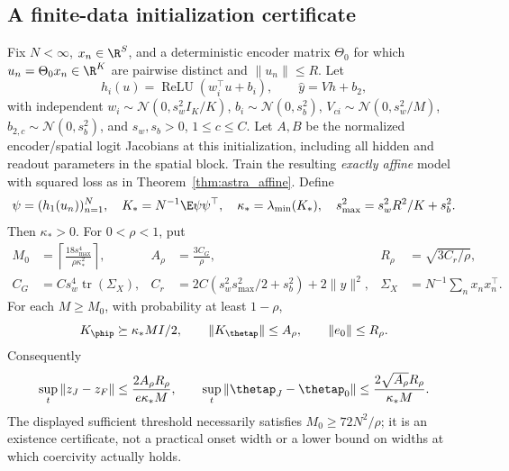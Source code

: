 \subsection{A finite-data initialization certificate}
\begin{corollary}
\label{cor:astra_init}
Fix $N<\infty$, $x_n\in\R^S$, and a deterministic encoder matrix
$\Theta_0$ for which $u_n=\Theta_0x_n\in\R^K$ are pairwise distinct
and $\|u_n\|\le R$. Let
\[
 h_i(u)=\operatorname{ReLU}(w_i^\top u+b_i),\qquad \hat y=Vh+b_2,
\]
with independent $w_i\sim\mathcal N(0,s_w^2I_K/K)$,
$b_i\sim\mathcal N(0,s_b^2)$, $V_{ci}\sim\mathcal N(0,s_w^2/M)$,
$b_{2,c}\sim\mathcal N(0,s_b^2)$, and $s_w,s_b>0$, $1\le c\le C$.
Let $A,B$ be the normalized encoder/spatial logit Jacobians at this
initialization, including all hidden and readout parameters in the
spatial block. Train the resulting \emph{exactly affine} model with
squared loss as in Theorem~\ref{thm:astra_affine}.
Define
\[
 \psi=(h_1(u_n))_{n=1}^N,\quad K_*=N^{-1}\E\psi\psi^\top,
 \quad\kappa_*=\lambda_{\min}(K_*),\quad
 s_{\max}^2=s_w^2R^2/K+s_b^2.
\]
Then $\kappa_*>0$. For $0<\rho<1$, put
\begin{align*}
 M_0&=\left\lceil\frac{18s_{\max}^4}{\rho\kappa_*^2}\right\rceil,
 & A_\rho&=\frac{3C_G}{\rho},
 & R_\rho&=\sqrt{3C_r/\rho},\\
 C_G&=Cs_w^4\operatorname{tr}(\Sigma_X),
 & C_r&=2C(s_w^2s_{\max}^2/2+s_b^2)+2\|y\|^2,
 &\Sigma_X&=N^{-1}\sum_nx_nx_n^\top.
\end{align*}
For each $M\ge M_0$, with probability at least $1-\rho$,
\[
 K_\phip\succeq\kappa_*M I/2,\qquad \|K_\thetap\|\le A_\rho,
 \qquad\|e_0\|\le R_\rho.
\]
Consequently
\[
 \sup_t\|z_J-z_F\|\le\frac{2A_\rho R_\rho}{e\kappa_*M},
 \qquad\sup_t\|\thetap_J-\thetap_0\|
 \le\frac{2\sqrt{A_\rho}R_\rho}{\kappa_*M}.
\]
The displayed sufficient threshold necessarily satisfies
$M_0\ge72N^2/\rho$; it is an existence certificate, not a practical
onset width or a lower bound on widths at which coercivity actually holds.
\end{corollary}
